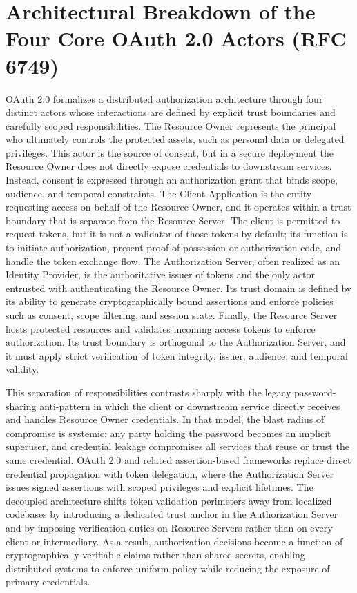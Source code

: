 \documentclass[11pt,a4paper]{report}
\begin{document}
\section{Architectural Breakdown of the Four Core OAuth 2.0 Actors (RFC 6749)}
\label{sec:oauth-actors}
OAuth 2.0 formalizes a distributed authorization architecture through four distinct actors whose interactions are defined by explicit trust boundaries and carefully scoped responsibilities. The Resource Owner represents the principal who ultimately controls the protected assets, such as personal data or delegated privileges. This actor is the source of consent, but in a secure deployment the Resource Owner does not directly expose credentials to downstream services. Instead, consent is expressed through an authorization grant that binds scope, audience, and temporal constraints. The Client Application is the entity requesting access on behalf of the Resource Owner, and it operates within a trust boundary that is separate from the Resource Server. The client is permitted to request tokens, but it is not a validator of those tokens by default; its function is to initiate authorization, present proof of possession or authorization code, and handle the token exchange flow. The Authorization Server, often realized as an Identity Provider, is the authoritative issuer of tokens and the only actor entrusted with authenticating the Resource Owner. Its trust domain is defined by its ability to generate cryptographically bound assertions and enforce policies such as consent, scope filtering, and session state. Finally, the Resource Server hosts protected resources and validates incoming access tokens to enforce authorization. Its trust boundary is orthogonal to the Authorization Server, and it must apply strict verification of token integrity, issuer, audience, and temporal validity.

This separation of responsibilities contrasts sharply with the legacy password-sharing anti-pattern in which the client or downstream service directly receives and handles Resource Owner credentials. In that model, the blast radius of compromise is systemic: any party holding the password becomes an implicit superuser, and credential leakage compromises all services that reuse or trust the same credential. OAuth 2.0 and related assertion-based frameworks replace direct credential propagation with token delegation, where the Authorization Server issues signed assertions with scoped privileges and explicit lifetimes. The decoupled architecture shifts token validation perimeters away from localized codebases by introducing a dedicated trust anchor in the Authorization Server and by imposing verification duties on Resource Servers rather than on every client or intermediary. As a result, authorization decisions become a function of cryptographically verifiable claims rather than shared secrets, enabling distributed systems to enforce uniform policy while reducing the exposure of primary credentials.
\end{document}
